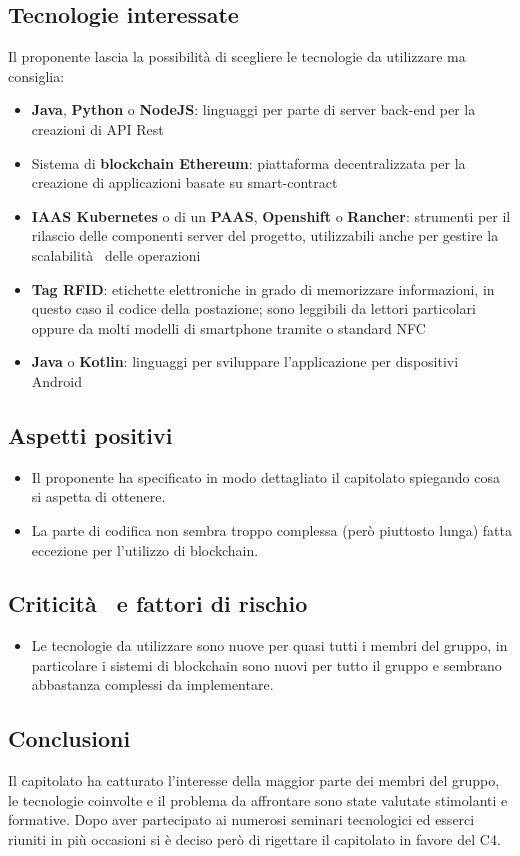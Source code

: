 \subsection{Tecnologie interessate}
Il proponente lascia la possibilità di scegliere le tecnologie da utilizzare ma consiglia:
\begin{itemize}
    \item \textbf{Java}, \textbf{Python} o \textbf{NodeJS}: linguaggi per parte di server back-end per la creazioni di API Rest
    \item Sistema di \textbf{blockchain Ethereum}: piattaforma decentralizzata per la creazione di applicazioni basate su smart-contract
    \item \textbf{IAAS Kubernetes} o di un \textbf{PAAS}, \textbf{Openshift} o \textbf{Rancher}: strumenti per il rilascio delle componenti server del progetto, utilizzabili anche per gestire la scalabilità  delle operazioni
    \item \textbf{Tag RFID}: etichette elettroniche in grado di memorizzare informazioni, in questo caso il codice della postazione; sono leggibili da lettori particolari oppure da molti modelli di smartphone tramite o standard NFC
    \item \textbf{Java} o \textbf{Kotlin}: linguaggi per sviluppare l'applicazione per dispositivi Android
\end{itemize}
\subsection{Aspetti positivi}
\begin{itemize}
    \item Il proponente ha specificato in modo dettagliato il capitolato spiegando cosa si aspetta di ottenere.
    \item La parte di codifica non sembra troppo complessa (però piuttosto lunga) fatta eccezione per l'utilizzo di blockchain.
\end{itemize}
\subsection{Criticità  e fattori di rischio}
\begin{itemize}
    \item Le tecnologie da utilizzare sono nuove per quasi tutti i membri del gruppo, in particolare i sistemi di blockchain sono nuovi per tutto il gruppo e sembrano abbastanza complessi da implementare.
\end{itemize}
\subsection{Conclusioni}
Il capitolato ha catturato l'interesse della maggior parte dei membri del gruppo, le tecnologie coinvolte e il problema da affrontare sono state valutate stimolanti e formative.
Dopo aver partecipato ai numerosi seminari tecnologici ed esserci riuniti in più occasioni si è deciso però di rigettare il capitolato in favore del C4.
